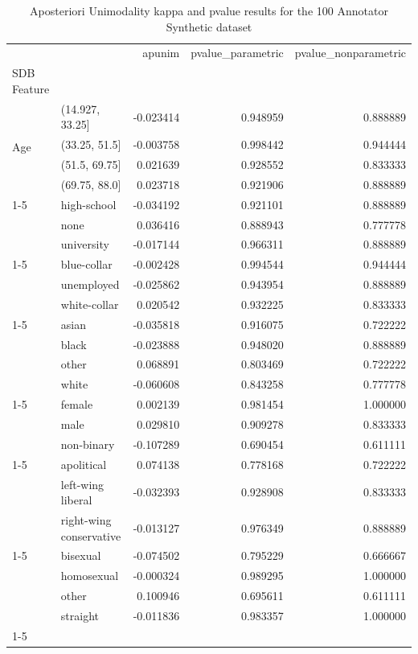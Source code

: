 \begin{table}
\caption{Aposteriori Unimodality kappa and pvalue results for the 100 Annotator Synthetic dataset}
\label{tab:results_100}
\begin{tabular}{llrrr}
\toprule
 &  & apunim & pvalue\_parametric & pvalue\_nonparametric \\
SDB Feature &  &  &  &  \\
\midrule
\multirow[t]{4}{*}{Age} & (14.927, 33.25] & -0.023414 & 0.948959 & 0.888889 \\
 & (33.25, 51.5] & -0.003758 & 0.998442 & 0.944444 \\
 & (51.5, 69.75] & 0.021639 & 0.928552 & 0.833333 \\
 & (69.75, 88.0] & 0.023718 & 0.921906 & 0.888889 \\
\cline{1-5}
\multirow[t]{3}{*}{Education} & high-school & -0.034192 & 0.921101 & 0.888889 \\
 & none & 0.036416 & 0.888943 & 0.777778 \\
 & university & -0.017144 & 0.966311 & 0.888889 \\
\cline{1-5}
\multirow[t]{3}{*}{Employment} & blue-collar & -0.002428 & 0.994544 & 0.944444 \\
 & unemployed & -0.025862 & 0.943954 & 0.888889 \\
 & white-collar & 0.020542 & 0.932225 & 0.833333 \\
\cline{1-5}
\multirow[t]{4}{*}{Ethnicity} & asian & -0.035818 & 0.916075 & 0.722222 \\
 & black & -0.023888 & 0.948020 & 0.888889 \\
 & other & 0.068891 & 0.803469 & 0.722222 \\
 & white & -0.060608 & 0.843258 & 0.777778 \\
\cline{1-5}
\multirow[t]{3}{*}{Gender} & female & 0.002139 & 0.981454 & 1.000000 \\
 & male & 0.029810 & 0.909278 & 0.833333 \\
 & non-binary & -0.107289 & 0.690454 & 0.611111 \\
\cline{1-5}
\multirow[t]{3}{*}{Political Affiliation} & apolitical & 0.074138 & 0.778168 & 0.722222 \\
 & left-wing liberal & -0.032393 & 0.928908 & 0.833333 \\
 & right-wing conservative & -0.013127 & 0.976349 & 0.888889 \\
\cline{1-5}
\multirow[t]{4}{*}{Sexual Orientation} & bisexual & -0.074502 & 0.795229 & 0.666667 \\
 & homosexual & -0.000324 & 0.989295 & 1.000000 \\
 & other & 0.100946 & 0.695611 & 0.611111 \\
 & straight & -0.011836 & 0.983357 & 1.000000 \\
\cline{1-5}
\bottomrule
\end{tabular}
\end{table}
